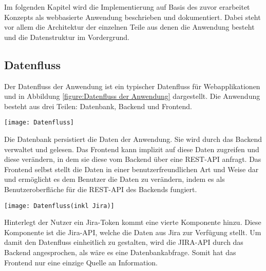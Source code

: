 
Im folgenden Kapitel wird die Implementierung auf Basis des zuvor erarbeitet Konzepts als webbasierte Anwendung beschrieben und dokumentiert. Dabei steht vor allem die Architektur der einzelnen Teile aus denen die Anwendung besteht und die Datenstruktur im Vordergrund.

\subsection{Datenfluss}
Der Datenfluss der Anwendung ist ein typischer Datenfluss für Webapplikationen und in Abbildung \ref{figure:Datenfluss der Anwendung} dargestellt. Die Anwendung besteht aus drei Teilen: Datenbank, Backend und Frontend.

\vspace{20pt}
\begin{center}
    \begin{minipage}{1\linewidth}
        \texttt{[image: Datenfluss]}
        \label{figure:Datenfluss der Anwendung}
    \end{minipage}
\end{center}
\vspace{20pt}

Die Datenbank persistiert die Daten der Anwendung. Sie wird durch das Backend verwaltet und gelesen. Das Frontend kann implizit auf diese Daten zugreifen und diese verändern, in dem sie diese vom Backend über eine REST-API anfragt. Das Frontend selbst stellt die Daten in einer benutzerfreundlichen Art und Weise dar und ermöglicht es dem Benutzer die Daten zu verändern, indem es als Benutzeroberfläche für die REST-API des Backends fungiert.

\vspace{20pt}
\begin{center}
    \begin{minipage}{1\linewidth}
        \texttt{[image: Datenfluss(inkl Jira)]}
    \end{minipage}
\end{center}
\vspace{20pt}

Hinterlegt der Nutzer ein Jira-Token kommt eine vierte Komponente hinzu. Diese Komponente ist die Jira-API, welche die Daten aus Jira zur Verfügung stellt. Um damit den Datenfluss einheitlich zu gestalten, wird die JIRA-API durch das Backend angesprochen, als wäre es eine Datenbankabfrage. Somit hat das Frontend nur eine einzige Quelle an Information.


